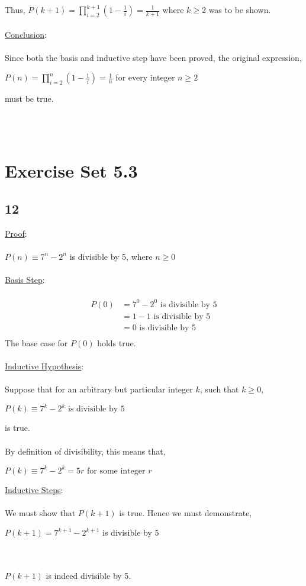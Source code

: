 \documentclass[12pt]{article}
\newcommand{\xconclusion}[1]{
    \underline{Conclusion}:
    \\ \\
    #1
    \\ \\
}
\newcommand{\xproof}[1]{
    \underline{Proof}:
    \\ \\
    #1
    \\ \\
}
\newcommand{\xbasisstep}{
    \underline{Basis Step}:
    \\ \\
}
\newcommand{\xinductivehypothesis}{
    \underline{Inductive Hypothesis}:
    \\ \\
}
\newcommand{\xinductivestep}{
    \underline{Inductive Steps}:
    \\ \\
}
\begin{document}
Thus, $P(k+1) = \prod_{i=2}^{k+1}\left(1-\frac{1}{i}\right) = \frac{1}{k+1}$ where $k \geq 2$ was to be shown.
\\ \\
\xconclusion{
Since both the basis and inductive step have been proved, the original expression,
\begin{center}
  $P(n)=\prod_{i=2}^n\left(1-\frac{1}{i}\right) = \frac{1}{n}$ for every integer $n \geq 2$
\end{center}
must be true.
}


\section*{Exercise Set 5.3}

\subsection*{12}
\xproof{$P(n) \equiv 7^n - 2^n$ is divisible by 5, where $n \geq 0$}
\xbasisstep
\begin{align*}
  P(0) &= 7^0 - 2^0 \text{ is divisible by 5} \\
  &= 1-1 \text{ is divisible by 5} \\
  &= 0 \text{ is divisible by 5} \\
\end{align*}
The base case for $P(0)$ holds true.
\\ \\
\xinductivehypothesis
Suppose that for an arbitrary but particular integer $k$, such that $k \geq 0$,
\begin{center}
  $P(k) \equiv 7^k - 2^k \text{ is divisible by 5}$
\end{center}
is true. \\ \\
By definition of divisibility, this means that,
\begin{center}
  $P(k) \equiv 7^k - 2^k = 5r \text{ for some integer }r$
\end{center}
\xinductivestep
We must show that $P(k+1)$ is true. Hence we must demonstrate,
\begin{center}
  $P(k+1) = 7^{k+1} - 2^{k+1}$ is divisible by 5
\end{center}
\newblock
\\ \\
$P(k+1)$ is indeed divisible by 5.
\end{document}
